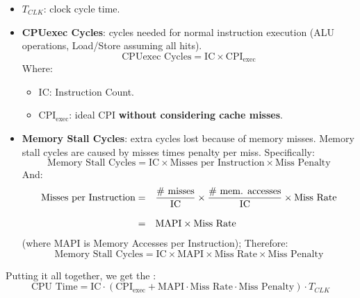 \begin{itemize}
    \item $T_{CLK}$: clock cycle time.
    \item \textbf{CPUexec Cycles}: cycles needed for normal instruction execution (ALU operations, Load/Store assuming all hits).
    \begin{equation}
        \text{CPUexec Cycles} = \text{IC} \times \text{CPI}_{\text{exec}}
    \end{equation}
    Where:
    \begin{itemize}
        \item IC: Instruction Count.
        \item $\text{CPI}_{\text{exec}}$: ideal CPI \textbf{without considering cache misses}.
    \end{itemize}

    \item \textbf{Memory Stall Cycles}: extra cycles lost because of memory misses. Memory stall cycles are caused by misses times penalty per miss. Specifically:
    \begin{equation}
        \text{Memory Stall Cycles} = \text{IC} \times \text{Misses per Instruction} \times \text{Miss Penalty}
    \end{equation}
    And:
    \begin{equation}\index{Memory Accesses per Instruction (MAPI)}
        \begin{array}{rl}
            \text{Misses per Instruction} =& \dfrac{\text{\# misses}}{\text{IC}} \times \dfrac{\text{\# mem. accesses}}{\text{IC}} \times \text{Miss Rate} \\ [1.5em]
            =& \text{MAPI} \times \text{Miss Rate}
        \end{array}
    \end{equation}
    (where MAPI is Memory Accesses per Instruction); Therefore:
    \begin{equation}
        \text{Memory Stall Cycles} = \text{IC} \times \text{MAPI} \times \text{Miss Rate} \times \text{Miss Penalty}
    \end{equation}
\end{itemize}
Putting it all together, we get the :
\begin{equation}
    \text{CPU Time} = \text{IC} \cdot (\text{CPI}_{\text{exec}} + \text{MAPI} \cdot \text{Miss Rate} \cdot \text{Miss Penalty}) \cdot T_{CLK}
\end{equation}
